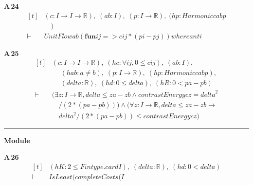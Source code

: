 \noindent\textbf{A\,24}\quad{}
{\footnotesize\[ \begin{aligned}[t]
&(\mathit{c} : \mathit{I} \to \mathit{I} \to \mathbb{R} ),\; (\mathit{a} \mathit{b} : \mathit{I}),\; (\mathit{p} : \mathit{I} \to \mathbb{R} ),\; (\mathit{hp} : \mathit{Harmonic} \mathit{c} \mathit{a} \mathit{b} \mathit{p}\\
&\quad )\\
\vdash\;&\mathit{UnitFlow} \mathit{a} \mathit{b} (\mathbf{fun} \mathit{i} \mathit{j} => \mathit{c} \mathit{i} \mathit{j}*(\mathit{p} \mathit{i}-\mathit{p} \mathit{j})) \mathit{where} \mathit{anti}
\end{aligned} \]}

\noindent\textbf{A\,25}\quad{}
{\footnotesize\[ \begin{aligned}[t]
&(\mathit{c} : \mathit{I} \to \mathit{I} \to \mathbb{R} ),\; (\mathit{hc} : \forall \mathit{i} \mathit{j}, 0 \leq \mathit{c} \mathit{i} \mathit{j}),\; (\mathit{a} \mathit{b} : \mathit{I}),\\
&\quad \; (\mathit{hab} : \mathit{a} \neq \mathit{b}),\; (\mathit{p} : \mathit{I} \to \mathbb{R} ),\; (\mathit{hp} : \mathit{Harmonic} \mathit{c} \mathit{a} \mathit{b} \mathit{p}),\\
&\quad \; (\mathit{delta} : \mathbb{R} ),\; (\mathit{hd} : 0 \leq \mathit{delta}),\; (\mathit{hR} : 0 < \mathit{p} \mathit{a}-\mathit{p} \mathit{b})\\
\vdash\;&(\exists \mathit{z} : \mathit{I} \to \mathbb{R} , \mathit{delta} \leq \mathit{z} \mathit{a}-\mathit{z} \mathit{b} \wedge \mathit{contrastEnergy} \mathit{c} \mathit{z} = \mathit{delta}^{2}\\
&\quad /(2*(\mathit{p} \mathit{a}-\mathit{p} \mathit{b}))) \wedge (\forall \mathit{z} : \mathit{I} \to \mathbb{R} , \mathit{delta} \leq \mathit{z} \mathit{a}-\mathit{z} \mathit{b} \to\\
&\quad \mathit{delta}^{2}/(2*(\mathit{p} \mathit{a}-\mathit{p} \mathit{b})) \leq \mathit{contrastEnergy} \mathit{c} \mathit{z})
\end{aligned} \]}

\vspace{4pt}\noindent\rule{\columnwidth}{0.4pt}\par\vspace{2pt}
\noindent\textbf{Module }\par\vspace{3pt}

\noindent\textbf{A\,26}\quad{}
{\footnotesize\[ \begin{aligned}[t]
&(\mathit{hK} : 2 \leq \mathit{Fintype}.\mathit{card} \mathit{I}),\; (\mathit{delta} : \mathbb{R} ),\; (\mathit{hd} : 0<\mathit{delta})\\
\vdash\;&\mathit{IsLeast} (\mathit{completeCosts} (\mathit{I}
\end{aligned} \]}

